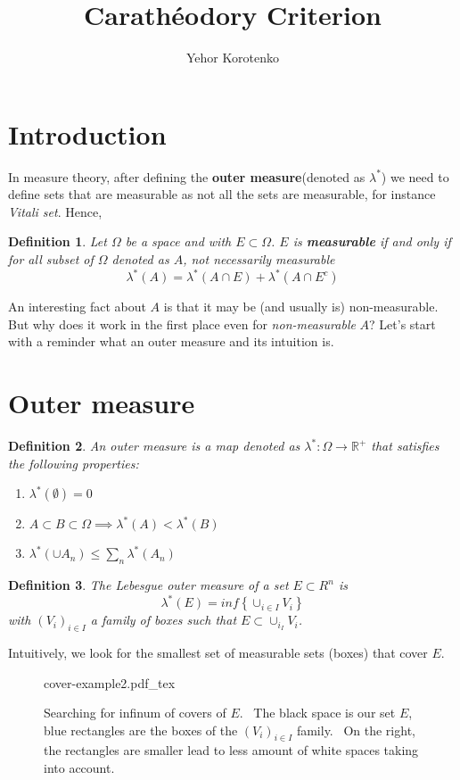 \documentclass[a4paper]{article}
\author{Yehor Korotenko}
\title{Carathéodory Criterion}
\newcommand{\incfig}[1]{%
    \def\svgwidth{\columnwidth}
    {#1.pdf_tex}
}
\newcommand{\R}{\mathbb{R}}
\newtheorem{definition}{Definition}[section]
\begin{document}
\section{Introduction}
   In measure theory, after defining the \textbf{outer measure}(denoted as $\lambda^*$) we need to
   define sets that are measurable as not all the sets are measurable, for
   instance \textit{Vitali set}. Hence,
\begin{definition}
Let $\Omega$ be a space and with $E \subset \Omega$. $E$ is  \textbf{measurable} if and only if for all subset of $\Omega$ denoted as $A$, not necessarily measurable
\[
\lambda^*(A) = \lambda^*(A \cap E) + \lambda^*(A \cap E^c)
\] 
\end{definition}
An interesting fact about $A$ is that it may be (and usually is)
non-measurable. But why does it work in the first place even for
\textit{non-measurable} $A$? Let's start with a reminder what an outer measure and its intuition is.

\section{Outer measure}%
\label{sec:Outer measure}
\begin{definition}
    An outer measure is a map denoted as $\lambda^*: \Omega \to \R^+$ that satisfies the following properties:
    \begin{enumerate}
        \item $\lambda^*(\emptyset) = 0$
        \item $A \subset B \subset \Omega \implies \lambda^*(A) < \lambda^*(B)$ 
        \item $\lambda^*(\cup A_n) \le \sum_n \lambda^*(A_n)$
    \end{enumerate}
\end{definition}
\begin{definition}\label{defn:lebesgue-outer-measure}
    The Lebesgue outer measure of a set $E \subset R^n$ is 
    \[
        \lambda^*(E) = inf \left\{ \cup_{i \in I} V_i \right\}
    \] 
    with $(V_i)_{i \in I}$ a family of boxes such that $E \subset \cup_{i_I} V_i$.
\end{definition}

Intuitively, we look for the smallest set of measurable sets (boxes) that cover
$E$.  

\begin{figure}[H]
    \centering
    \incfig{cover-example2}
    \caption{Searching for infinum of covers of $E$. \
        The black space is our
        set $E$, blue rectangles are the boxes of the  $(V_i)_{i \in I}$
        family. \
        On the right, the rectangles are smaller lead to less amount of white spaces taking into account.}
    \label{fig:cover-example2}
\end{figure}
\end{document}
